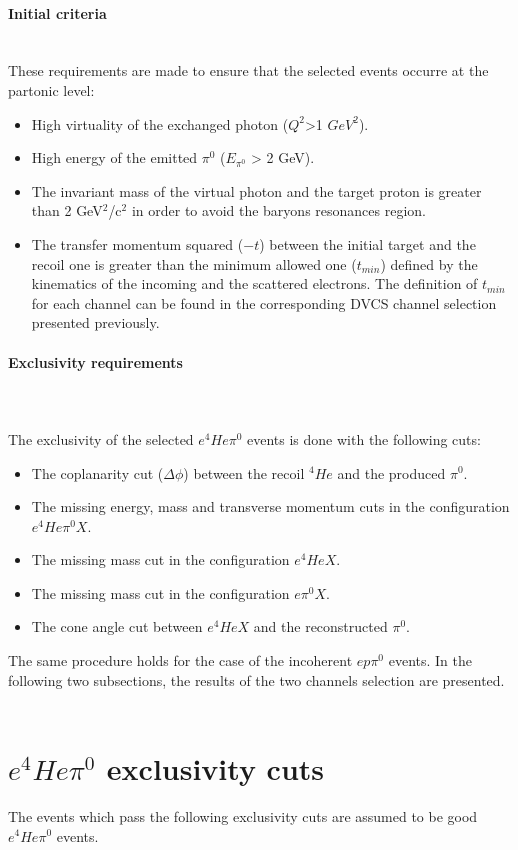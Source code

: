 \paragraph{Initial criteria} ~\\
These requirements are made to ensure that the selected events occurre at the partonic level:
\begin{itemize}
\item High virtuality of the exchanged photon ($Q^{2}$>1 $GeV^{2}$).
\item High energy of the emitted $\pi^{0}$ ($E_{\pi^{0}}$ > 2 GeV).
\item The invariant mass of the virtual photon and the target proton is greater than 2 GeV$^{2}$/c$^{2}$ in order to avoid the baryons resonances region.
\item The transfer momentum squared ($-t$) between the initial target and the recoil one is greater than the minimum allowed one ($t_{min}$) defined by the kinematics of the incoming and the scattered electrons. The definition of $t_{min}$ for each channel can be found in the corresponding DVCS channel selection presented previously.
\end{itemize}

\paragraph{Exclusivity requirements}
~\\
~\\The exclusivity of the selected $e^{4}He\pi^{0}$ events is done with the following cuts:
\begin{itemize}
\item The coplanarity cut ($\Delta \phi$) between the recoil $^{4}He$ and the produced $\pi^{0}$.
\item The missing energy, mass and transverse momentum cuts in the configuration $e^{4}He\pi^{0}X$.
\item The missing mass cut in the configuration $e^{4}HeX$.
\item The missing mass cut in the configuration $e\pi^{0}X$.
\item The cone angle cut between $e^{4}HeX$ and the reconstructed $\pi^{0}$.
\end{itemize}
  The same procedure holds for the case of the incoherent $ep\pi^{0}$ events. In the following two subsections, the results of the two channels selection are presented.
~\newpage
\section{$e^{4}He\pi^{0}$ exclusivity cuts}
The events which pass the following exclusivity cuts are assumed to be good $e^{4}He\pi^{0}$ events.

